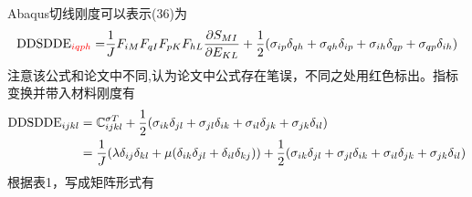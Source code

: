\documentclass{article}
\begin{document}
Abaqus切线刚度可以表示\cite{nguy}(36)为
\begin{equation*}
    \begin{aligned}
        {\rm DDSDDE}_{{\color{red}iqph}}= & \frac{1}{J}F_{iM}F_{qI}F_{pK}F_{hL}\frac{\partial S_{MI}}{\partial E_{KL}}+\frac{1}{2}(\sigma_{ip}\delta_{qh}+\sigma_{qh}\delta_{ip}+\sigma_{ih}\delta_{qp}+\sigma_{qp}\delta_{ih}) \\
    \end{aligned}
\end{equation*}
{\color{red} 注意该公式和论文中不同,认为论文中公式存在笔误，不同之处用红色标出。}指标变换并带入材料刚度有
\begin{equation*}
    \begin{aligned}
        {\rm DDSDDE}_{ijkl} & =\mathbb{C}^{\sigma T}_{ijkl} +\frac{1}{2}(\sigma_{ik}\delta_{jl}+\sigma_{jl}\delta_{ik}+\sigma_{il}\delta_{jk}+\sigma_{jk}\delta_{il})                                                                   \\
                            & =\frac{1}{J}(\lambda \delta_{ij} \delta_{kl}+\mu(\delta_{ik}\delta_{jl}+\delta_{il}\delta_{kj}))+\frac{1}{2}(\sigma_{ik}\delta_{jl}+\sigma_{jl}\delta_{ik}+\sigma_{il}\delta_{jk}+\sigma_{jk}\delta_{il})
    \end{aligned}
\end{equation*}
根据表1，写成矩阵形式有
\end{document}
